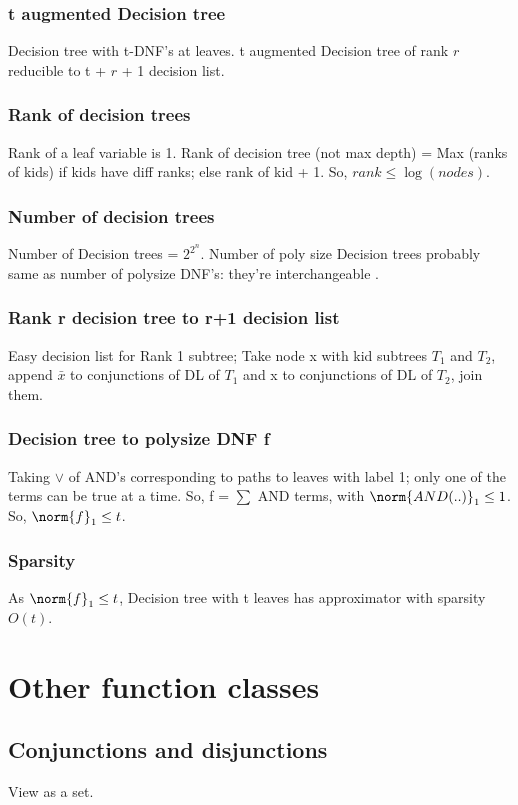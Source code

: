 \documentclass[oneside, article]{memoir}
\begin{document}
\subsection{t augmented Decision tree}
Decision tree with t-DNF's at leaves. t augmented Decision tree of rank $r$ reducible to t + $r$ + 1 decision list.

\subsection{Rank of decision trees}
Rank of a leaf variable is 1. Rank of decision tree (not max depth) = Max (ranks of kids) if kids have diff ranks; else rank of kid + 1. So, $rank \leq \log(nodes)$.

\subsection{Number of decision trees}
Number of Decision trees = $2^{2^{n}}$. Number of poly size Decision trees probably same as number of polysize DNF's: they're interchangeable \chk.

\subsection{Rank r decision tree to r+1 decision list}
Easy decision list for Rank 1 subtree; Take node x with kid subtrees $T_{1}$ and $T_{2}$, append $\bar{x}$ to conjunctions of DL of $T_{1}$ and x to conjunctions of DL of $T_{2}$, join them.

\subsection{Decision tree to polysize DNF f}
Taking $\lor$ of AND's corresponding to paths to leaves with label 1; only one of the terms can be true at a time. So, f = $\sum$ AND terms, with $\norm{AND(..)}_{1} \leq 1$. So, $\norm{f}_{1}\leq t$.

\subsection{Sparsity}
As $\norm{f}_{1}\leq t$, Decision tree with t leaves has approximator with sparsity $O(t)$.

\chapter{Other function classes}
\section{Conjunctions and disjunctions}
View as a set.
\end{document}
